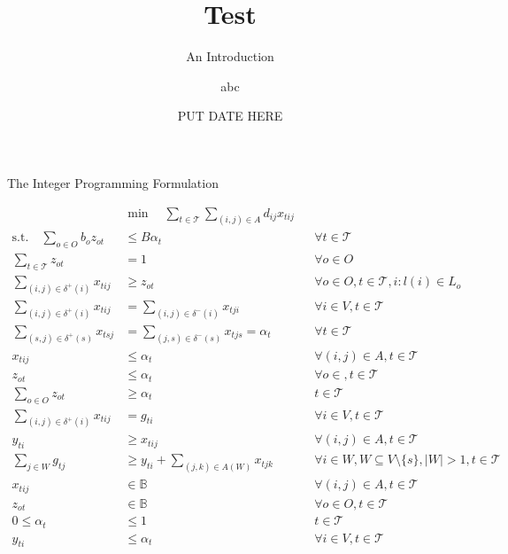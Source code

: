 \documentclass{beamer}
\title[Presentation Title]{Test}
\subtitle{An Introduction}
\author{abc}
\date{PUT DATE HERE}
\begin{document}
\begin{frame}{The Integer Programming Formulation}
\centering
\fontsize{4pt}{5pt}\selectfont
\begin{minipage}{.7\textwidth}
\begin{align}
&\min \quad 
\sum_{t\in\mathcal{T}} \sum_{(i,j)\in A} d_{ij} x_{tij}\\
\text{s.t.}\quad
\sum_{o\in O} b_o z_{ot} &\leq B\alpha_t \quad && \forall t \in \mathcal{T}\\
\sum_{t\in \mathcal{T}} z_{ot} &= 1 \quad && \forall o\in O\\
\sum_{(i,j)\in \delta^+(i)} x_{tij} &\geq z_{ot} \quad && \forall o \in O, t\in \mathcal{T}, i:l(i)\in L_o\\
\sum_{(i,j)\in \delta^+(i)} x_{tij} &= \sum_{(i,j)\in \delta^-(i)} x_{tji} \quad && \forall i\in V, t\in \mathcal{T}\\
\sum_{(s,j)\in \delta^+(s)} x_{tsj} &= \sum_{(j,s)\in \delta^-(s)} x_{tjs} = \alpha_t \quad && \forall t\in \mathcal{T}\\
x_{tij} &\leq \alpha_t \quad && \forall (i,j)\in A, t\in \mathcal{T}\\
z_{ot} &\leq \alpha_t \quad && \forall o\in , t\in \mathcal{T}\label{8}\\
\sum_{o\in O} z_{ot} &\geq \alpha_t \quad && t\in \mathcal{T}\\
\sum_{(i,j)\in \delta^+(i)} x_{tij} &= g_{ti} \quad && \forall i\in V, t\in \mathcal{T}\\
y_{ti} &\geq x_{tij} \quad && \forall (i,j)\in A, t\in \mathcal{T}\\
\sum_{j\in W} g_{tj} &\geq y_{ti} + \sum_{(j,k)\in A(W)} x_{tjk} \quad && \forall i \in W, W \subseteq V \setminus \{s\},|W|>1, t\in\mathcal{T}\\
x_{tij} &\in \mathbb{B} \quad && \forall (i,j)\in A, t\in \mathcal{T}\\
z_{ot} &\in \mathbb{B} \quad && \forall o\in O, t\in \mathcal{T}\\
0 \leq \alpha_t &\leq 1 \quad && t\in\mathcal{T}\\
y_{ti} &\leq \alpha_t \quad && \forall i\in V, t\in \mathcal{T}
\end{align}
\end{minipage}
\end{frame}
\end{document}
